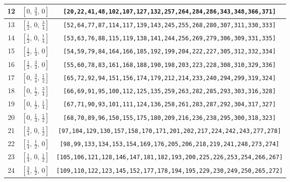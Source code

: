 \documentclass[fleqn,8pt]{jsarticle}
\begin{document}
\begin{longtable}{ccc}
12 & $\left[ 0,\, \frac{3}{4},\, 0 \right]$ & {\tt [20,22,41,48,102,107,127,132,257,264,284,286,343,348,366,371]} \\ \hline
13 & $\left[ \frac{1}{2},\, 0,\, \frac{3}{4} \right]$ & {\tt [52,64,77,87,114,117,139,143,245,255,268,280,307,311,330,333]} \\ \hline
14 & $\left[ \frac{1}{2},\, 0,\, \frac{1}{4} \right]$ & {\tt [53,63,76,88,115,119,138,141,244,256,269,279,306,309,331,335]} \\ \hline
15 & $\left[ \frac{1}{2},\, \frac{1}{4},\, 0 \right]$ & {\tt [54,59,79,84,164,166,185,192,199,204,222,227,305,312,332,334]} \\ \hline
16 & $\left[ \frac{1}{2},\, \frac{3}{4},\, 0 \right]$ & {\tt [55,60,78,83,161,168,188,190,198,203,223,228,308,310,329,336]} \\ \hline
17 & $\left[ 0,\, \frac{3}{4},\, \frac{1}{2} \right]$ & {\tt [65,72,92,94,151,156,174,179,212,214,233,240,294,299,319,324]} \\ \hline
18 & $\left[ 0,\, \frac{1}{2},\, \frac{3}{4} \right]$ & {\tt [66,69,91,95,100,112,125,135,259,263,282,285,293,303,316,328]} \\ \hline
19 & $\left[ 0,\, \frac{1}{2},\, \frac{1}{4} \right]$ & {\tt [67,71,90,93,101,111,124,136,258,261,283,287,292,304,317,327]} \\ \hline
20 & $\left[ 0,\, \frac{1}{4},\, \frac{1}{2} \right]$ & {\tt [68,70,89,96,150,155,175,180,209,216,236,238,295,300,318,323]} \\ \hline
21 & $\left[ \frac{3}{4},\, 0,\, \frac{1}{2} \right]$ & {\tt [97,104,129,130,157,158,170,171,201,202,217,224,242,243,277,278]} \\ \hline
22 & $\left[ \frac{1}{4},\, \frac{1}{2},\, 0 \right]$ & {\tt [98,99,133,134,153,154,169,176,205,206,218,219,241,248,273,274]} \\ \hline
23 & $\left[ \frac{1}{4},\, 0,\, \frac{1}{2} \right]$ & {\tt [105,106,121,128,146,147,181,182,193,200,225,226,253,254,266,267]} \\ \hline
24 & $\left[ \frac{3}{4},\, \frac{1}{2},\, 0 \right]$ & {\tt [109,110,122,123,145,152,177,178,194,195,229,230,249,250,265,272]} \\
\end{longtable}
\renewcommand{\arraystretch}{1.2}
\end{document}
